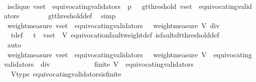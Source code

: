 \begin{isabellebody}
\ \ \ \ \isamarkupfalse%
\ {\isacartoucheopen}is{\isacharunderscore}clique\ {\isacharparenleft}v{\isacharunderscore}set\ {\isacharminus}\ equivocating{\isacharunderscore}validators\ {\isasymsigma}{\isacharcomma}\ p{\isacharcomma}\ {\isasymsigma}{\isacharparenright}\ {\isasymand}\ gt{\isacharunderscore}threshold\ {\isacharparenleft}v{\isacharunderscore}set\ {\isacharminus}\ equivocating{\isacharunderscore}validators\ {\isasymsigma}{\isacharcomma}\ {\isasymsigma}{\isacharparenright}{\isacartoucheclose}\isanewline
\ \ \ \ \isamarkupfalse%
\ gt{\isacharunderscore}threshold{\isacharunderscore}def\ \isamarkupfalse%
\ simp\isanewline
\ \ \isamarkupfalse%
\ \isamarkupfalse%
\ {\isachardoublequoteopen}weight{\isacharunderscore}measure\ {\isacharparenleft}v{\isacharunderscore}set\ {\isacharminus}\ equivocating{\isacharunderscore}validators\ {\isasymsigma}{\isacharparenright}\ {\isachargreater}\ {\isacharparenleft}weight{\isacharunderscore}measure\ V{\isacharparenright}\ div\ {}{\isachardoublequoteclose}\isanewline
\ \ \ \ \isamarkupfalse%
\ \ {\isasymSigma}t{\isacharunderscore}def\ {\isacartoucheopen}{\isasymsigma}\ {\isasymin}\ {\isasymSigma}t\ {\isasymand}\ v{\isacharunderscore}set\ {\isasymsubseteq}\ V{\isacartoucheclose}\ equivocation{\isacharunderscore}fault{\isacharunderscore}weight{\isacharunderscore}def\ is{\isacharunderscore}faults{\isacharunderscore}lt{\isacharunderscore}threshold{\isacharunderscore}def\ \isanewline
\ \ \ \ \isamarkupfalse%
\ auto\isanewline
\ \ \isamarkupfalse%
\ \isamarkupfalse%
\ {\isachardoublequoteopen}weight{\isacharunderscore}measure\ {\isacharparenleft}v{\isacharunderscore}set\ {\isacharminus}\ equivocating{\isacharunderscore}validators\ {\isasymsigma}{\isacharparenright}\ {\isachargreater}\ {\isacharparenleft}weight{\isacharunderscore}measure\ {\isacharparenleft}V\ {\isacharminus}\ equivocating{\isacharunderscore}validators\ {\isasymsigma}{\isacharparenright}{\isacharparenright}\ div\ {}{\isachardoublequoteclose}\isanewline
\ \ \isamarkupfalse%
\ {\isacharminus}\ \isanewline
\ \ \ \ \isamarkupfalse%
\ {\isachardoublequoteopen}finite\ {\isacharparenleft}V\ {\isacharminus}\ equivocating{\isacharunderscore}validators\ {\isasymsigma}{\isacharparenright}{\isachardoublequoteclose}\isanewline
\ \ \ \ \ \ \isamarkupfalse%
\ \ V{\isacharunderscore}type\ equivocating{\isacharunderscore}validators{\isacharunderscore}is{\isacharunderscore}finite\isanewline

\end{isabellebody}
